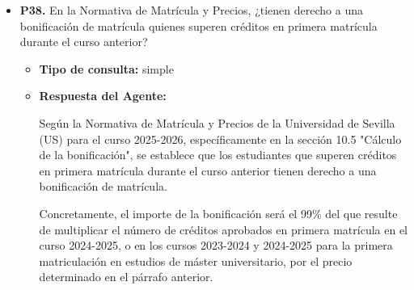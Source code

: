 \documentclass{article}
\begin{document}
\begin{itemize}
\begin{itemize}
\begin{scriptsize}
                  \#\# Artículo 114. Profesoras y profesores sustitutos.
                  1. En los supuestos admitidos por la legislación universitaria estatal y autonómica y la legislación laboral, la Universidad de Sevilla podrá contratar profesoras y profesores sustitutos.
                  2. El contrato de profesorado sustituto comprenderá la actividad docente lectiva y no lectiva, que no podrá superar la asignada a la profesora o profesor a quien que se sustituya. También podrá extenderse a actividades universitarias de otra naturaleza, como las de investigación o el desempeño de funciones estructurales de gestión y coordinación, siempre que tengan directa relación con la actividad docente y resulten compatibles con el encargo docente.
                  3. La selección del profesorado sustituto se producirá mediante concurso público. Se podrán establecer instrumentos específicos para su gestión y cobertura, incluidas las bolsas de empleo.
                  4. Una normativa del Consejo de Gobierno regulará el procedimiento de concurso y podrá contemplar un baremo general, además de los criterios a los que deban ajustarse.

                  Depósito Legal: SE-410/1979. ISSN: 2253-802X https://www.juntadeandalucia.es/eboja

                  00319829
                \end{scriptsize}
        \end{itemize}


  \item \textbf{P38.} En la Normativa de Matrícula y Precios, ¿tienen derecho a una bonificación de matrícula quienes superen créditos en primera matrícula durante el curso anterior? \\
        \begin{itemize}
          \item \textbf{Tipo de consulta:} simple
          \item \textbf{Respuesta del Agente:}

                Según la Normativa de Matrícula y Precios de la Universidad de Sevilla (US) para el curso 2025-2026, específicamente en la sección 10.5 "Cálculo de la bonificación", se establece que los estudiantes que superen créditos en primera matrícula durante el curso anterior tienen derecho a una bonificación de matrícula.

                Concretamente, el importe de la bonificación será el 99\% del que resulte de multiplicar el número de créditos aprobados en primera matrícula en el curso 2024-2025, o en los cursos 2023-2024 y 2024-2025 para la primera matriculación en estudios de máster universitario, por el precio determinado en el párrafo anterior.


\end{itemize}
\end{itemize}
\end{document}
